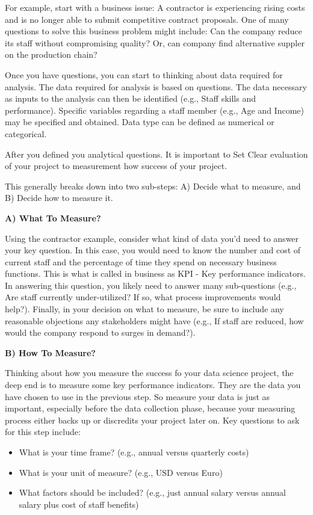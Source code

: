 \documentclass[
]{book}
\providecommand{\tightlist}{%
  \setlength{\itemsep}{0pt}\setlength{\parskip}{0pt}}
\begin{document}
For example, start with a business issue: A contractor is experiencing rising costs and is no longer able to submit competitive contract proposals. One of many questions to solve this business problem might include: Can the company reduce its staff without compromising quality? Or, can company find alternative suppler on the production chain?

Once you have questions, you can start to thinking about data required for analysis. The data required for analysis is based on questions. The data necessary as inputs to the analysis can then be identified (e.g., Staff skills and performance). Specific variables regarding a staff member (e.g., Age and Income) may be specified and obtained. Data type can be defined as numerical or categorical.

After you defined you analytical questions. It is important to Set Clear evaluation of your project to measurement how success of your project.

This generally breaks down into two sub-steps: A) Decide what to measure, and B) Decide how to measure it.

\textbf{A) What To Measure?}

Using the contractor example, consider what kind of data you'd need to answer your key question. In this case, you would need to know the number and cost of current staff and the percentage of time they spend on necessary business functions. This is what is called in business as KPI - Key performance indicators. In answering this question, you likely need to answer many sub-questions (e.g., Are staff currently under-utilized? If so, what process improvements would help?). Finally, in your decision on what to measure, be sure to include any reasonable objections any stakeholders might have (e.g., If staff are reduced, how would the company respond to surges in demand?).

\textbf{B) How To Measure? }

Thinking about how you measure the success fo your data science project, the deep end is to measure some key performance indicators. They are the data you have chosen to use in the previous step. So measure your data is just as important, especially before the data collection phase, because your measuring process either backs up or discredits your project later on. Key questions to ask for this step include:

\begin{itemize}
\tightlist
\item
  What is your time frame? (e.g., annual versus quarterly costs)
\item
  What is your unit of measure? (e.g., USD versus Euro)
\item
  What factors should be included? (e.g., just annual salary versus annual salary plus cost of staff benefits)
\end{itemize}
\end{document}
